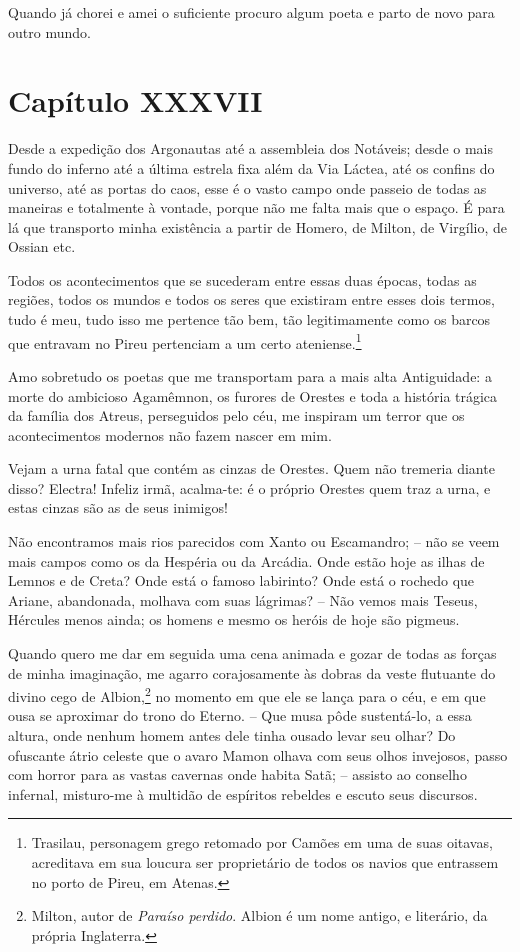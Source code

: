  Quando já chorei e amei o suficiente procuro algum poeta e parto de
novo para outro mundo. 

\section{Capítulo XXXVII}

 Desde a expedição dos Argonautas até a assembleia dos Notáveis; desde o
mais fundo do inferno até a última estrela fixa além da Via Láctea, até
os confins do universo, até as portas do caos, esse é o vasto campo
onde passeio de todas as maneiras  e totalmente à vontade, porque não
me falta mais que o espaço. É para lá que transporto minha existência a
partir de Homero, de Milton, de Virgílio, de Ossian etc.

 Todos os acontecimentos que se sucederam entre essas duas épocas, todas
as regiões, todos os mundos e todos os seres que existiram entre esses
dois termos, tudo é meu, tudo isso me pertence tão bem, tão
legitimamente como os barcos que entravam no Pireu pertenciam a um
certo ateniense.\footnote{ Trasilau, personagem grego retomado por
Camões em uma de suas oitavas, acreditava em sua loucura ser
proprietário de todos os navios que entrassem no porto de Pireu, em Atenas.} 

 Amo sobretudo os poetas que me transportam para a mais alta
Antiguidade: a morte do ambicioso Agamêmnon, os furores de Orestes e
toda a história trágica da família dos Atreus, perseguidos pelo céu, me
inspiram um terror que os acontecimentos modernos não fazem nascer em
mim.

 Vejam a urna fatal que contém as cinzas de Orestes. Quem não tremeria
diante disso? Electra! Infeliz irmã, acalma-te: é o próprio Orestes
quem traz a urna, e estas cinzas são as de seus inimigos!

 Não encontramos mais rios parecidos com Xanto ou Escamandro; -- não se
veem mais campos como os da Hespéria ou da Arcádia. Onde estão hoje as
ilhas de Lemnos e de Creta? Onde está o famoso labirinto? Onde está o
rochedo que Ariane, abandonada, molhava com suas lágrimas? -- Não
vemos mais Teseus, Hércules menos ainda; os homens e mesmo os heróis de
hoje são pigmeus.

 Quando quero me dar em seguida uma cena animada e gozar de todas as
forças de minha imaginação, me agarro corajosamente às dobras da veste
flutuante do divino cego de Albion,\footnote{ Milton, autor de
\textit{Paraíso perdido}. Albion é um nome antigo, e literário, da
própria Inglaterra.} no momento em que ele se lança para o céu, e
em que ousa se aproximar do trono do Eterno. -- Que musa pôde
sustentá-lo, a essa altura, onde nenhum homem antes dele tinha ousado
levar seu olhar? Do ofuscante átrio celeste que o avaro Mamon olhava
com seus olhos invejosos, passo com horror para as vastas cavernas onde
habita Satã; -- assisto ao conselho infernal, misturo-me à multidão de
espíritos rebeldes e escuto seus discursos.


